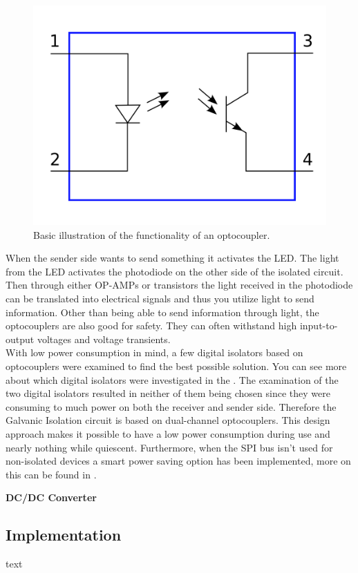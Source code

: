 \begin{figure}[H]
	\centering
	\includegraphics[width=0.5\linewidth]{Hardware/Pictures/BMSoptocoup}
	\caption[Empty]{Basic illustration of the functionality of an optocoupler\footnotemark.}
	\label{fig:BMSoptocoup}
\end{figure}

When the sender side wants to send something it activates the LED. The light from the LED activates the photodiode on the other side of the isolated circuit. Then through either OP-AMPs or transistors the light received in the photodiode can be translated into electrical signals and thus you utilize light to send information. Other than being able to send information through light, the optocouplers are also good for safety. They can often withstand high input-to-output voltages and voltage transients. \\
With low power consumption in mind, a few digital isolators based on optocouplers were examined to find the best possible solution. You can see more about which digital isolators were investigated in the . The examination of the two digital isolators resulted in neither of them being chosen since they were consuming to much power on both the receiver and sender side. Therefore the Galvanic Isolation circuit is based on dual-channel optocouplers. This design approach makes it possible to have a low power consumption during use and nearly nothing while quiescent. Furthermore, when the SPI bus isn't used for non-isolated devices a smart power saving option has been implemented, more on this can be found in .

\textbf{DC/DC Converter}





\subsection{Implementation}
text

